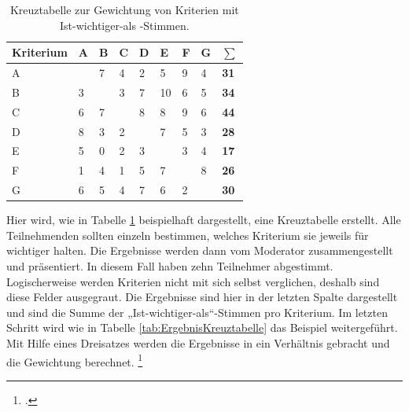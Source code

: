 \begin{table}[htb]
	\centering
	\begin{tabular}{|l||l|l|l|l|l|l|l||l|}
		\hline
		\textbf{Kriterium} & A & B & C & D & E  & F & G & $\sum$      \\
		\hline \hline
		A                  & ~ & 7 & 4 & 2 & 5  & 9 & 4 & \textbf{31} \\
		\hline
		B                  & 3 & ~ & 3 & 7 & 10 & 6 & 5 & \textbf{34} \\
		\hline
		C                  & 6 & 7 & ~ & 8 & 8  & 9 & 6 & \textbf{44} \\
		\hline
		D                  & 8 & 3 & 2 & ~ & 7  & 5 & 3 & \textbf{28} \\
		\hline
		E                  & 5 & 0 & 2 & 3 & ~  & 3 & 4 & \textbf{17} \\
		\hline
		F                  & 1 & 4 & 1 & 5 & 7  & ~ & 8 & \textbf{26} \\
		\hline
		G                  & 6 & 5 & 4 & 7 & 6  & 2 & ~ & \textbf{30} \\
		\hline
	\end{tabular}
	\caption[Kreuztabelle zur Gewichtung von Kriterien mit \glqq Ist-wichtiger-als \glqq -Stimmen]{Kreuztabelle zur Gewichtung von Kriterien mit \glqq Ist-wichtiger-als \grqq -Stimmen. \footnotemark}
	\label{tab:KreuztabelleKriterien}
\end{table}

Hier wird, wie in Tabelle \ref{tab:KreuztabelleKriterien} beispielhaft dargestellt, eine Kreuztabelle erstellt. Alle Teilnehmenden sollten einzeln bestimmen, welches Kriterium sie jeweils für wichtiger halten. Die Ergebnisse werden dann vom Moderator zusammengestellt und präsentiert. In diesem Fall haben zehn Teilnehmer abgestimmt. Logischerweise werden Kriterien nicht mit sich selbst verglichen, deshalb sind diese Felder ausgegraut. Die Ergebnisse sind hier in der letzten Spalte dargestellt und sind die Summe der „Ist-wichtiger-als“-Stimmen pro Kriterium. Im letzten Schritt wird wie in Tabelle \ref{tab:ErgebnisKreuztabelle} das Beispiel weitergeführt. Mit Hilfe eines Dreisatzes werden die Ergebnisse in ein Verhältnis gebracht und die Gewichtung berechnet. \footcite[Vgl. ][S. 13 ff.]{Kuhnapfel.2019}

